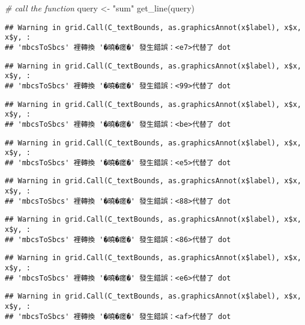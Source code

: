 \documentclass[
]{article}
\newenvironment{Shaded}{\begin{snugshade}}{\end{snugshade}}
\newcommand{\CommentTok}[1]{\textcolor[rgb]{0.56,0.35,0.01}{\textit{#1}}}
\newcommand{\FunctionTok}[1]{\textcolor[rgb]{0.00,0.00,0.00}{#1}}
\newcommand{\NormalTok}[1]{#1}
\newcommand{\OtherTok}[1]{\textcolor[rgb]{0.56,0.35,0.01}{#1}}
\newcommand{\StringTok}[1]{\textcolor[rgb]{0.31,0.60,0.02}{#1}}
\begin{document}
\begin{Shaded}
\begin{Highlighting}[]
\CommentTok{\# call the function}
\NormalTok{query }\OtherTok{\textless{}{-}} \StringTok{"sum"}
\FunctionTok{get\_line}\NormalTok{(query)}
\end{Highlighting}
\end{Shaded}

\begin{verbatim}
## Warning in grid.Call(C_textBounds, as.graphicsAnnot(x$label), x$x, x$y, :
## 'mbcsToSbcs' 裡轉換 '�曉�瘥�' 發生錯誤：<e7>代替了 dot
\end{verbatim}

\begin{verbatim}
## Warning in grid.Call(C_textBounds, as.graphicsAnnot(x$label), x$x, x$y, :
## 'mbcsToSbcs' 裡轉換 '�曉�瘥�' 發生錯誤：<99>代替了 dot
\end{verbatim}

\begin{verbatim}
## Warning in grid.Call(C_textBounds, as.graphicsAnnot(x$label), x$x, x$y, :
## 'mbcsToSbcs' 裡轉換 '�曉�瘥�' 發生錯誤：<be>代替了 dot
\end{verbatim}

\begin{verbatim}
## Warning in grid.Call(C_textBounds, as.graphicsAnnot(x$label), x$x, x$y, :
## 'mbcsToSbcs' 裡轉換 '�曉�瘥�' 發生錯誤：<e5>代替了 dot
\end{verbatim}

\begin{verbatim}
## Warning in grid.Call(C_textBounds, as.graphicsAnnot(x$label), x$x, x$y, :
## 'mbcsToSbcs' 裡轉換 '�曉�瘥�' 發生錯誤：<88>代替了 dot
\end{verbatim}

\begin{verbatim}
## Warning in grid.Call(C_textBounds, as.graphicsAnnot(x$label), x$x, x$y, :
## 'mbcsToSbcs' 裡轉換 '�曉�瘥�' 發生錯誤：<86>代替了 dot
\end{verbatim}

\begin{verbatim}
## Warning in grid.Call(C_textBounds, as.graphicsAnnot(x$label), x$x, x$y, :
## 'mbcsToSbcs' 裡轉換 '�曉�瘥�' 發生錯誤：<e6>代替了 dot
\end{verbatim}

\begin{verbatim}
## Warning in grid.Call(C_textBounds, as.graphicsAnnot(x$label), x$x, x$y, :
## 'mbcsToSbcs' 裡轉換 '�曉�瘥�' 發生錯誤：<af>代替了 dot
\end{verbatim}
\end{document}
